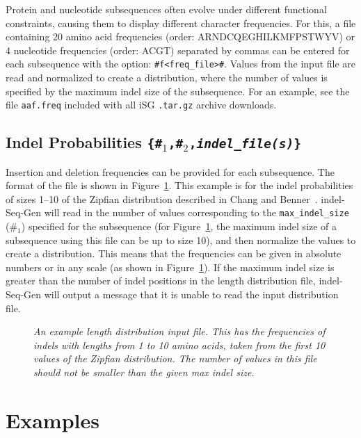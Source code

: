 \documentclass[10pt]{article}
\begin{document}
Protein and nucleotide subsequences often evolve under different functional constraints, causing them to display different character frequencies. For this, a file containing 20 amino acid frequencies (order: ARNDCQEGHILKMFPSTWYV) or 4 nucleotide frequencies (order: ACGT) separated by commas can be entered for each subsequence with the option: 
\verb+#f<freq_file>#+.  Values from the input file are read and normalized to create a 
distribution, where the number of values is specified by the maximum indel size of the 
subsequence. For an example, see the file {\tt aaf.freq} included with all iSG {\tt .tar.gz} archive downloads.

\subsection{Indel Probabilities {\tt \{\#$_1$,\#$_2$,{\it indel\_file(s)}\}}}

Insertion and deletion frequencies can be provided for each subsequence.  The format of the file is shown in Figure~\ref{fig:zipf}.  This example is for the indel probabilities of sizes 1--10 of the Zipfian distribution described in Chang and Benner~\cite{Chang04}.  
indel-Seq-Gen will read in the number of values corresponding to the {\tt max\_indel\_size} (\#$_1$) specified for the subsequence (for Figure~\ref{fig:zipf}, the maximum indel size of a subsequence using this file can be up to size 10), and then normalize the values to create a distribution.  This means that the frequencies can be given in absolute numbers or in any scale (as shown in Figure~\ref{fig:zipf}).  If the maximum indel size is greater than the number of indel positions in the length distribution file, indel-Seq-Gen will output a message that it is unable to read the input distribution file.

\begin{figure}[htbp]
\centering
{}
\caption{\textit{An example length distribution input file.  This has the frequencies of indels with lengths from 1 to 10 amino acids, taken from the first 10 values of the Zipfian distribution.  The number of values in this file should not be smaller than the given max indel size.}}
\label{fig:zipf}
\end{figure}

\section{Examples}
\label{sec:example}
\end{document}
